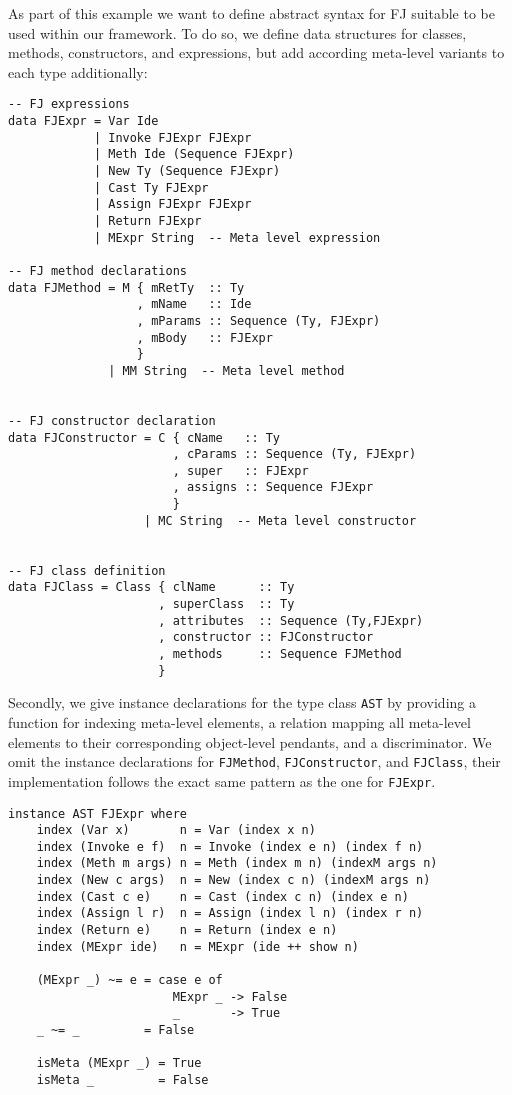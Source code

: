 As part of this example we want to define abstract syntax for
\textsc{FJ} suitable to be used within our framework. To do so, we
define data structures for classes, methods, constructors, and
expressions, but add according meta-level variants to each type
additionally:

\smallskip

\begin{lstlisting}
-- FJ expressions
data FJExpr = Var Ide
            | Invoke FJExpr FJExpr
            | Meth Ide (Sequence FJExpr)
            | New Ty (Sequence FJExpr)
            | Cast Ty FJExpr
            | Assign FJExpr FJExpr
            | Return FJExpr
            | MExpr String  -- Meta level expression

-- FJ method declarations
data FJMethod = M { mRetTy  :: Ty
                  , mName   :: Ide
                  , mParams :: Sequence (Ty, FJExpr)
                  , mBody   :: FJExpr
                  }
              | MM String  -- Meta level method


-- FJ constructor declaration
data FJConstructor = C { cName   :: Ty
                       , cParams :: Sequence (Ty, FJExpr)
                       , super   :: FJExpr
                       , assigns :: Sequence FJExpr
                       }
                   | MC String  -- Meta level constructor


-- FJ class definition
data FJClass = Class { clName      :: Ty
                     , superClass  :: Ty
                     , attributes  :: Sequence (Ty,FJExpr)
                     , constructor :: FJConstructor
                     , methods     :: Sequence FJMethod
                     }
\end{lstlisting}

\smallskip
Secondly, we give instance declarations for the type class
\texttt{AST} by providing a function for indexing meta-level elements,
a relation mapping all meta-level elements to their corresponding
object-level pendants, and a discriminator. We omit the instance
declarations for \texttt{FJMethod}, \texttt{FJConstructor}, and
\texttt{FJClass}, their implementation follows the exact same pattern
as the one for \texttt{FJExpr}.

\smallskip
\begin{lstlisting}
instance AST FJExpr where
    index (Var x)       n = Var (index x n)
    index (Invoke e f)  n = Invoke (index e n) (index f n)
    index (Meth m args) n = Meth (index m n) (indexM args n)
    index (New c args)  n = New (index c n) (indexM args n)
    index (Cast c e)    n = Cast (index c n) (index e n)
    index (Assign l r)  n = Assign (index l n) (index r n)
    index (Return e)    n = Return (index e n)
    index (MExpr ide)   n = MExpr (ide ++ show n)

    (MExpr _) ~= e = case e of
                       MExpr _ -> False
                       _       -> True
    _ ~= _         = False

    isMeta (MExpr _) = True
    isMeta _         = False
\end{lstlisting}

